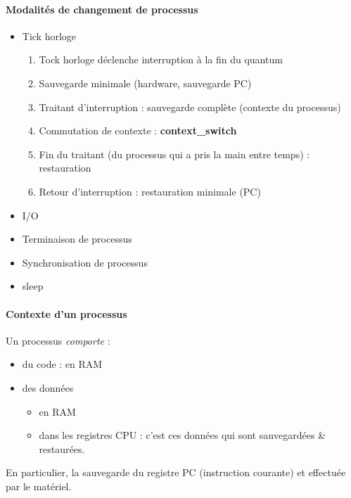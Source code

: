 \documentclass[11pt]{article}
\begin{document}
\paragraph{Modalités de changement de processus}
\begin{itemize}
    \item Tick horloge
    \begin{enumerate}
        \item Tock horloge déclenche interruption à la fin du quantum
        \item Sauvegarde minimale (hardware, sauvegarde PC)
        \item Traitant d'interruption : sauvegarde complète (contexte du processus)
        \item Commutation de contexte : \textbf{context\_switch}
        \item Fin du traitant (du processus qui a pris la main entre temps) : restauration
        \item Retour d'interruption : restauration minimale (PC)
    \end{enumerate}
    \item I/O
    \item Terminaison de processus
    \item Synchronisation de processus
    \item sleep
\end{itemize}

\paragraph{Contexte d'un processus}
Un processus \textit{comporte} :
\begin{itemize}
    \item du code : en RAM
    \item des données \begin{itemize}
        \item en RAM
        \item dans les registres CPU : c'est ces données qui sont sauvegardées \& restaurées.
    \end{itemize}
\end{itemize}

En particulier, la sauvegarde du registre PC (instruction courante) et effectuée par le matériel.
\end{document}
